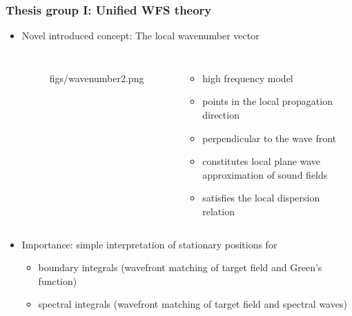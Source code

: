 \documentclass{beamer}
\begin{document}
\begin{frame}
\frametitle{Thesis group I: Unified WFS theory}
\begin{itemize}
\item Novel introduced concept: The local wavenumber vector
\begin{columns}
%
\begin{figure}
	\centering
	\begin{overpic}[width = 0.9\columnwidth]{figs/wavenumber2.png}
	\scriptsize
	\end{overpic}
\end{figure}
\footnotesize
%
\begin{itemize}
\item high frequency model
\item points in the local propagation direction
\item perpendicular to the wave front
\item constitutes local plane wave approximation of sound fields
\item satisfies the local dispersion relation
\end{itemize}
\end{columns}
\item Importance: simple interpretation of stationary positions for
\begin{itemize}\footnotesize	
\item boundary integrals (wavefront matching of target field and Green's function)
\item spectral integrals (wavefront matching of target field and spectral waves)
\end{itemize}
\end{itemize}
\end{frame} 
\end{document}

